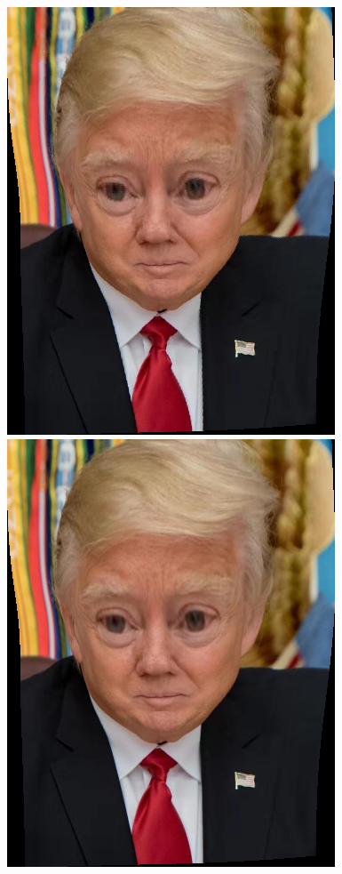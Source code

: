 \documentclass[UTF8]{ctexart}
\begin{document}
\begin{figure}[H]
    \centering
    \includegraphics[scale=0.28]{images/report-images/8to6nearest.png}
    \includegraphics[scale=0.28]{images/report-images/8to6bilinear.png}

\end{figure}
\end{document}
